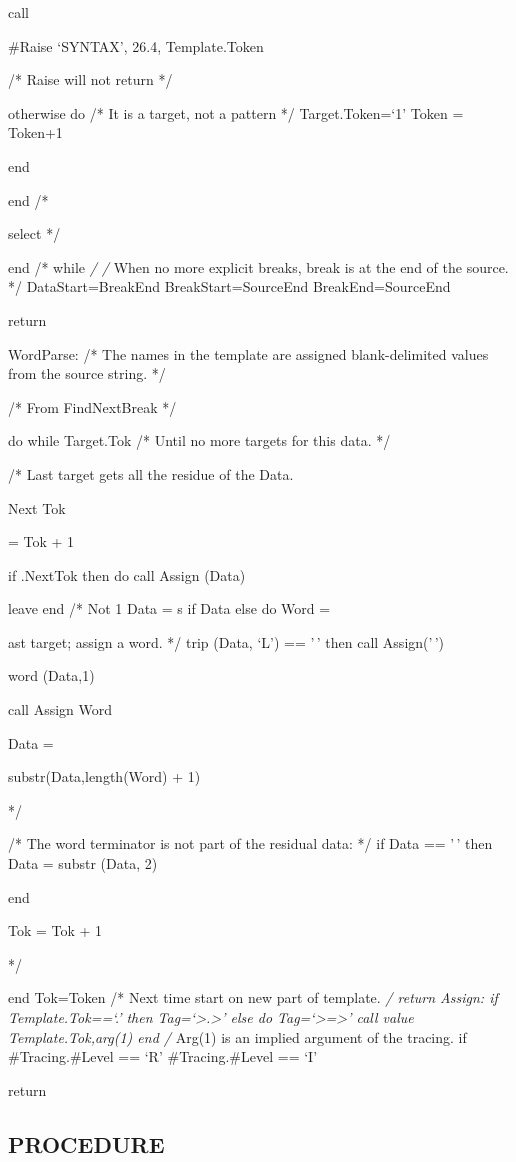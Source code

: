call

\#Raise `SYNTAX', 26.4, Template.Token

/* Raise will not return */

otherwise do /* It is a target, not a pattern */ Target.Token=`1' Token
= Token+1

end

end /*

select */

end /* while \emph{/ /} When no more explicit breaks, break is at the
end of the source. */ DataStart=BreakEnd BreakStart=SourceEnd
BreakEnd=SourceEnd

return

WordParse: /* The names in the template are assigned blank-delimited
values from the source string. */

/* From FindNextBreak */

do while Target.Tok /* Until no more targets for this data. */

/* Last target gets all the residue of the Data.

Next Tok

= Tok + 1

if \Target.NextTok then do call Assign (Data)

leave end /* Not 1 Data = s if Data else do Word =

ast target; assign a word. */ trip (Data, `L') == '\,' then call
Assign('\,')

word (Data,1)

call Assign Word

Data =

substr(Data,length(Word) + 1)

*/

/* The word terminator is not part of the residual data: */ if Data ==
'\,' then Data = substr (Data, 2)

end

Tok = Tok + 1

*/

end Tok=Token /* Next time start on new part of template. \emph{/ return
Assign: if Template.Tok==`.' then Tag=`\textgreater.\textgreater{}' else
do Tag=`\textgreater=\textgreater{}' call value Template.Tok,arg(1) end
/} Arg(1) is an implied argument of the tracing. if \#Tracing.\#Level ==
`R' \textbar{} \#Tracing.\#Level == `I'

return

\subsection{PROCEDURE}\label{procedure}

